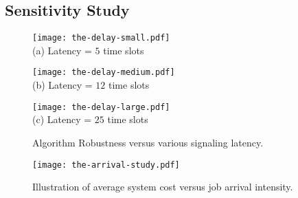 \subsection{Sensitivity Study}
\label{subsec:advance}
\begin{figure*}[ht!]                                                                %
    \centering                                                                      %
    \begin{minipage}[b]{0.30\textwidth}                                             %
        \texttt{[image: the-delay-small.pdf]} \\              %
        (a) Latency = $5$ time slots
    \end{minipage}                                                                  %
    \begin{minipage}[b]{0.30\textwidth}                                             %
        \texttt{[image: the-delay-medium.pdf]} \\             %
        (b) Latency = $12$ time slots
    \end{minipage}                                                                  %
    \begin{minipage}[b]{0.30\textwidth}                                             %
        \texttt{[image: the-delay-large.pdf]} \\               %
        (c) Latency = $25$ time slots
    \end{minipage}                                                                  %
    \caption{Algorithm Robustness versus various signaling latency.}                %
    \label{fig:ss_signal}                                                           %
\end{figure*}                                                                       %


\begin{figure}[hbt]                                                 %
    \centering                                                      %
    \texttt{[image: the-arrival-study.pdf]}   %
    \caption{Illustration of average system cost versus job arrival intensity.}
    \label{fig:ss_scale}                                            %
\end{figure}                                                        %

